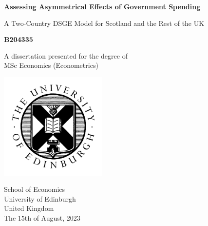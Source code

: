 \begin{titlepage}
    \begin{center}
        \vspace*{1cm}
        \LARGE
        \textbf{Assessing Asymmetrical Effects of Government Spending}
 
        \vspace{0.5cm}
        A Two-Country DSGE Model for Scotland and the Rest of the UK
             
        \vspace{1.5cm}
 
        \textbf{B204335}
 
        \vfill
             
        A dissertation presented for the degree of\\
        MSc Economics (Econometrics) 
             
        \vspace{0.8cm}
      
        \includegraphics[width=0.4\textwidth]{./Title Page/uoe_logo.png}
             
        School of Economics\\
        University of Edinburgh\\
        United Kingdom\\
        The 15th of August, 2023
             
    \end{center}
 \end{titlepage}
